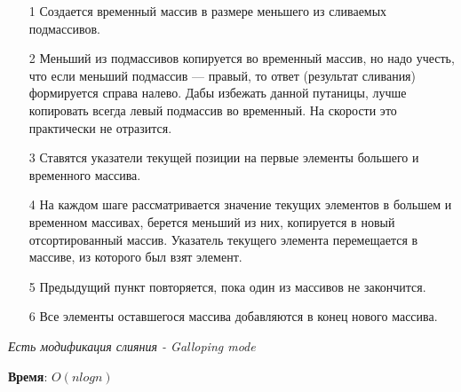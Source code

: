 \begin{itemize}
    \item[1]  Создается временный массив в размере меньшего из сливаемых подмассивов.
    \item[2]  Меньший из подмассивов копируется во временный массив, но надо учесть, что если меньший подмассив — правый, то ответ (результат сливания) формируется справа налево. Дабы избежать данной путаницы, лучше копировать всегда левый подмассив во временный. На скорости это практически не отразится. 
	\item[3] Ставятся указатели текущей позиции на первые элементы большего и временного массива.
	\item[4]  На каждом шаге рассматривается значение текущих элементов в большем и временном массивах, берется меньший из них, копируется в новый отсортированный массив. Указатель текущего элемента перемещается в массиве, из которого был взят элемент.
	\item[5] Предыдущий пункт повторяется, пока один из массивов не закончится.
	\item[6] Все элементы оставшегося массива добавляются в конец нового массива.
\end{itemize}

\noindent\textit{Есть модификация слияния - Galloping mode}

\noindent\textbf{Время}: $O(n log n)$